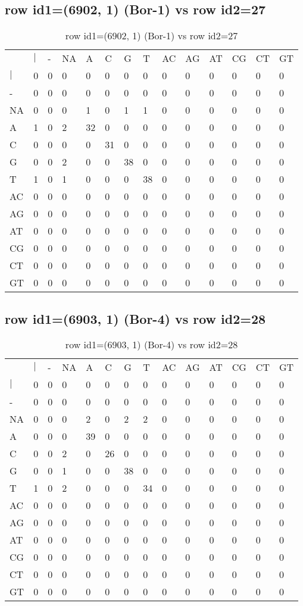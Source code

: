 \subsection{row id1=(6902, 1) (Bor-1) vs row id2=27}
\begin{center}
\begin{longtable}{|l|l|l|l|l|l|l|l|l|l|l|l|l|l|}
\caption{row id1=(6902, 1) (Bor-1) vs row id2=27} \label{table_dm70}\\
\hline
\\
\hline
&$|$&-&NA&A&C&G&T&AC&AG&AT&CG&CT&GT\\
$|$&0&0&0&0&0&0&0&0&0&0&0&0&0\\
-&0&0&0&0&0&0&0&0&0&0&0&0&0\\
NA&0&0&0&1&0&1&1&0&0&0&0&0&0\\
A&1&0&2&32&0&0&0&0&0&0&0&0&0\\
C&0&0&0&0&31&0&0&0&0&0&0&0&0\\
G&0&0&2&0&0&38&0&0&0&0&0&0&0\\
T&1&0&1&0&0&0&38&0&0&0&0&0&0\\
AC&0&0&0&0&0&0&0&0&0&0&0&0&0\\
AG&0&0&0&0&0&0&0&0&0&0&0&0&0\\
AT&0&0&0&0&0&0&0&0&0&0&0&0&0\\
CG&0&0&0&0&0&0&0&0&0&0&0&0&0\\
CT&0&0&0&0&0&0&0&0&0&0&0&0&0\\
GT&0&0&0&0&0&0&0&0&0&0&0&0&0\\
\hline
\end{longtable}
\end{center}

\subsection{row id1=(6903, 1) (Bor-4) vs row id2=28}
\begin{center}
\begin{longtable}{|l|l|l|l|l|l|l|l|l|l|l|l|l|l|}
\caption{row id1=(6903, 1) (Bor-4) vs row id2=28} \label{table_dm72}\\
\hline
\\
\hline
&$|$&-&NA&A&C&G&T&AC&AG&AT&CG&CT&GT\\
$|$&0&0&0&0&0&0&0&0&0&0&0&0&0\\
-&0&0&0&0&0&0&0&0&0&0&0&0&0\\
NA&0&0&0&2&0&2&2&0&0&0&0&0&0\\
A&0&0&0&39&0&0&0&0&0&0&0&0&0\\
C&0&0&2&0&26&0&0&0&0&0&0&0&0\\
G&0&0&1&0&0&38&0&0&0&0&0&0&0\\
T&1&0&2&0&0&0&34&0&0&0&0&0&0\\
AC&0&0&0&0&0&0&0&0&0&0&0&0&0\\
AG&0&0&0&0&0&0&0&0&0&0&0&0&0\\
AT&0&0&0&0&0&0&0&0&0&0&0&0&0\\
CG&0&0&0&0&0&0&0&0&0&0&0&0&0\\
CT&0&0&0&0&0&0&0&0&0&0&0&0&0\\
GT&0&0&0&0&0&0&0&0&0&0&0&0&0\\
\hline
\end{longtable}
\end{center}


